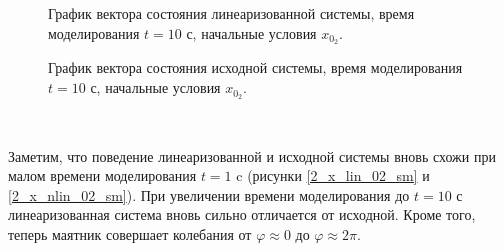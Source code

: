 \begin{figure}[!h]
\caption{График вектора состояния линеаризованной системы, время моделирования $t=10$ с, начальные условия $x_{0_2}$.}
\label{2_x_lin_02_lg}
\end{figure}

\begin{figure}[!h]
\caption{График вектора состояния исходной системы, время моделирования $t=10$ с, начальные условия $x_{0_2}$.}
\label{2_x_nlin_02_lg}
\end{figure}




\newpage
\,
\newpage



Заметим, что поведение линеаризованной и исходной системы вновь схожи при малом времени моделирования $t=1$ c (рисунки \ref{2_x_lin_02_sm} и \ref{2_x_nlin_02_sm}). При увеличении времени моделирования до $t=10$ с линеаризованная система вновь сильно отличается от исходной. Кроме того, теперь маятник совершает колебания от $\varphi \approx 0$ до $\varphi \approx 2 \pi$. 





